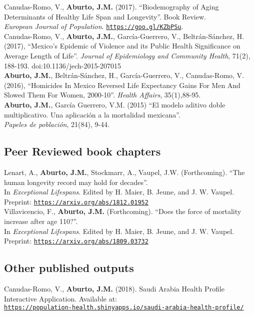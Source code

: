 \documentclass[12pt]{article}
\providecommand*\url[1]{\href{#1}{#1}}
\renewcommand*\url[1]{\href{#1}{\texttt{#1}}}
\begin{document}
Canudas-Romo, V.,  \textbf{Aburto, J.M.} (2017). ``Biodemography of Aging Determinants of Healthy Life Span and Longevity''. Book Review.\\ \emph{European Journal of Population}. \url{https://goo.gl/KZbPSu}. \\ 

Canudas-Romo, V.,  \textbf{Aburto, J.M.}, Garc\'ia-Guerrero, V., Beltr\'an-S\'anchez, H. (2017),  ``Mexico's Epidemic of Violence and its Public Health Significance on Average Length of Life''. \emph{Journal of Epidemiology and Community Health}, 71(2), 188-193. doi:10.1136/jech-2015-207015 \\ 
	 
\textbf{Aburto, J.M.}, Beltr\'an-S\'anchez, H., Garc\'ia-Guerrero, V., Canudas-Romo, V. (2016), ``Homicides In Mexico Reversed Life Expectancy Gains For Men And Slowed Them For Women, 2000-10''. \emph{Health Affairs}, 35(1),88-95. \\ 
		     
		  \textbf{Aburto, J.M.}, Garc\'ia Guerrero, V.M. (2015) ``El modelo aditivo doble multiplicativo. Una aplicaci\'on a la mortalidad mexicana''.\\  \emph{Papeles de poblaci\'on}, 21(84), 9-44. \\
		  
\subsection*{Peer Reviewed book chapters}
Lenart, A., \textbf{Aburto, J.M.}, Stockmarr, A., Vaupel, J.W. (Forthcoming). ``The human longevity record may hold for decades''.\\ In \emph{Exceptional Lifespans}. Edited by H. Maier, B. Jeune, and J. W. Vaupel. \\ 
Preprint: \url{https://arxiv.org/abs/1812.01952}\\

Villavicencio, F., \textbf{Aburto, J.M.} (Forthcoming). ``Does the force of mortality increase after age 110?''.\\ In \emph{Exceptional Lifespans}. Edited by H. Maier, B. Jeune, and J. W. Vaupel. \\
Preprint: \url{https://arxiv.org/abs/1809.03732}\\
		  		  
\subsection*{Other published outputs}	
Canudas-Romo, V., \textbf{Aburto, J.M.} (2018). Saudi Arabia Health Profile Interactive Application. Available at: \\
\small{\url{https://population-health.shinyapps.io/saudi-arabia-health-profile/}}  \\
\end{document}

